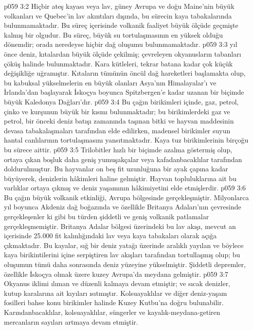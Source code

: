 \vs p059 3:2 Hiçbir ateş kayası veya lav, güney Avrupa ve doğu Maine’nin büyük volkanları ve Quebec’in lav akıntıları dışında, bu sürecin kaya tabakalarında bulunmamaktadır. Bu süreç içerisinde volkanik faaliyet büyük ölçüde geçmişte kalmış bir olgudur. Bu süreç, büyük su tortulaşmasının en yüksek olduğu dönemdir; orada neredeyse hiçbir dağ oluşumu bulunmamaktadır.
\vs p059 3:3  yıl önce deniz, kıtalardan büyük ölçüde çekilmiş; çevreleyen okyanusların tabanları çöküş halinde bulunmaktadır. Kara kütleleri, tekrar batana kadar çok küçük değişikliğe uğramıştır. Kıtaların tümünün öncül dağ hareketleri başlamakta olup, bu kabuksal yükselmelerin en büyük olanları Asya’nın Himalayalar’ı ve İrlanda’dan başlayarak İskoçya boyunca Spitzbergen’e kadar uzanan bir biçimde büyük Kaledonya Dağları’dır.
\vs p059 3:4 Bu çağın birikimleri içinde, gaz, petrol, çinko ve kurşunun büyük bir kısmı bulunmaktadır; bu birikimlerdeki gaz ve petrol, bir önceki deniz batışı zamanında taşınan bitki ve hayvan maddesinin devasa tabakalaşmaları tarafından elde edilirken, madensel birikimler suyun hantal canlılarının tortulaşmasını yansıtmaktadır. Kaya tuz birikimlerinin birçoğu bu sürece aittir.
\vs p059 3:5 Trilobitler hızlı bir biçimde azalma göstermiş olup, ortaya çıkan boşluk daha geniş yumuşakçalar veya kafadanbacaklılar tarafından doldurulmuştur. Bu hayvanlar on beş fit uzunluğuna bir ayak çapına kadar büyüyerek, denizlerin hâkimleri haline gelmiştir. Hayvan topluluklarına ait bu varlıklar  ortaya çıkmış ve deniz yaşamının hâkimiyetini elde etmişlerdir.
\vs p059 3:6 Bu çağın büyük volkanik etkinliği, Avrupa bölgesinde gerçekleşmiştir. Milyonlarca yıl boyunca Akdeniz dağ boğazında ve özellikle Britanya Adaları’nın çevresinde gerçekleşenler ki gibi bu türden şiddetli ve geniş volkanik patlamalar gerçekleşmemiştir. Britanya Adalar bölgesi üzerindeki bu lav akışı, mevcut an içerisinde 25.000 fit kalınlığındaki lav veya kaya tabakaları olarak açığa çıkmaktadır. Bu kayalar, sığ bir deniz yatağı üzerinde aralıklı yayılan ve böylece kaya birikintilerini içine serpiştiren lav akışları tarafından tortullaşmış olup; bu oluşumun tümü daha sonrasında deniz yüzeyine yükselmiştir. Şiddetli depremler, özellikle İskoçya olmak üzere kuzey Avrupa’da meydana gelmiştir.
\vs p059 3:7 Okyanus iklimi ılıman ve düzenli kalmaya devam etmiştir; ve sıcak denizler, kutup karalarına ait kıyıları ısıtmıştır. Kolsuayaklılar ve diğer deniz\hyp{}yaşam fosilleri bahse konu birikimler halinde Kuzey Kutbu’na doğru bulunabilir. Karındanbacaklılar, kolsuayaklılar, süngerler ve kayalık\hyp{}meydana\hyp{}getiren mercanların sayıları artmaya devam etmiştir.
